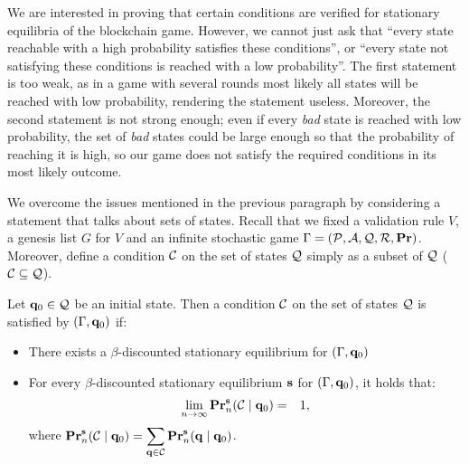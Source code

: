 We are interested in proving that certain conditions are verified for stationary equilibria of the blockchain game. 
However, we cannot just ask that ``every state reachable with a high probability satisfies these conditions'', or 
``every state not satisfying these conditions is reached with a low probability''. 
The first statement is too weak, as in a game with several rounds 
most likely all states will be reached with low probability, rendering the statement useless. Moreover, the second statement is not strong enough; even if every \emph{bad} state is reached with 
low probability, the set of \emph{bad} states could be large enough so that the probability of reaching it is high, so our game does not satisfy the  required conditions in its most likely outcome. 

We overcome the issues mentioned in the previous paragraph by considering a statement that talks about sets of states. Recall that we  fixed a validation rule $V$, a genesis list $G$ for $V$ and an infinite stochastic game $\Gamma = (\mathcal{P},\mathcal{A},\mathcal{Q},\mathcal{R},\mathbf{Pr})$. Moreover,  define a condition $\mathcal{C}$ on the set of states $\mathcal{Q}$ simply as a subset of $\mathcal{Q}$ ($\mathcal{C} \subseteq \mathcal{Q}$). 

\begin{mydef}
Let $\mathbf{q}_0 \in \mathcal{Q}$ be an initial state. Then a condition $\mathcal{C}$ on the set of states $\mathcal{Q}$ is satisfied by $(\Gamma, \mathbf{q}_0)$ if:
	\begin{itemize}
		\item There exists a $\beta$-discounted stationary equilibrium for $(\Gamma, \mathbf{q}_0)$
		
		\item For every $\beta$-discounted stationary equilibrium $\mathbf{s}$ for $(\Gamma, \mathbf{q}_0)$, it holds that:
\begin{eqnarray*}
\lim_{n \to \infty} \mathbf{Pr}_n^{\mathbf{s}}(\mathcal{C} \mid \mathbf{q}_0) & = & 1, 
\end{eqnarray*}
where ${\displaystyle \mathbf{Pr}_n^{\mathbf{s}}(\mathcal{C} \mid \mathbf{q}_0) = \sum_{\mathbf{q} \in \mathcal{C}} \mathbf{Pr}_n^{\mathbf{s}}(\mathbf{q} \mid \mathbf{q}_0)}$. 

		\end{itemize}
\end{mydef}


